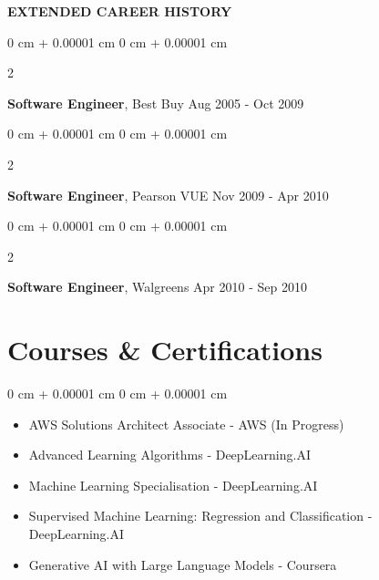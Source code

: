 \documentclass[10pt, letterpaper]{article}
\newif\ifAustralia
\newenvironment{highlights}{
    \begin{itemize}[
        topsep=0.10 cm,
        parsep=0.10 cm,
        partopsep=0pt,
        itemsep=0pt,
        leftmargin=0 cm + 10pt
    ]
}{
    \end{itemize}
} %
\newenvironment{onecolentry}{
    \begin{adjustwidth}{
        0 cm + 0.00001 cm
    }{
        0 cm + 0.00001 cm
    }
}{
    \end{adjustwidth}
} %
\newenvironment{twocolentry}[2][]{
    \onecolentry
    \def\secondColumn{#2}
    \setcolumnwidth{\fill, 4.5 cm}
    \begin{paracol}{2}
}{
    \switchcolumn \raggedleft \secondColumn
    \end{paracol}
    \endonecolentry
} %
\begin{document}
        \vspace{0.20 cm}
        \ifAustralia
            \newpage
        \fi
        \textbf{EXTENDED CAREER HISTORY}
        
        \vspace{0.10 cm}
        \begin{twocolentry}{
            Aug 2005 - Oct 2009
        }
            \textbf{Software Engineer}, Best Buy\end{twocolentry}
        
        \vspace{0.10 cm}
        \begin{twocolentry}{
            Nov 2009 - Apr 2010
        }
            \textbf{Software Engineer}, Pearson VUE\end{twocolentry}
        
        \vspace{0.10 cm}
        \begin{twocolentry}{
            Apr 2010 - Sep 2010
        }
            \textbf{Software Engineer}, Walgreens\end{twocolentry}

        \section{Courses \& Certifications}
        \vspace{0.10 cm}
        \begin{onecolentry}
            \begin{highlights}
                \item AWS Solutions Architect Associate - AWS (In Progress)
                \item Advanced Learning Algorithms - DeepLearning.AI
                \item Machine Learning Specialisation - DeepLearning.AI
                \item Supervised Machine Learning: Regression and Classification - DeepLearning.AI
                \item Generative AI with Large Language Models - Coursera
            \end{highlights}
        \end{onecolentry}
\end{document}
